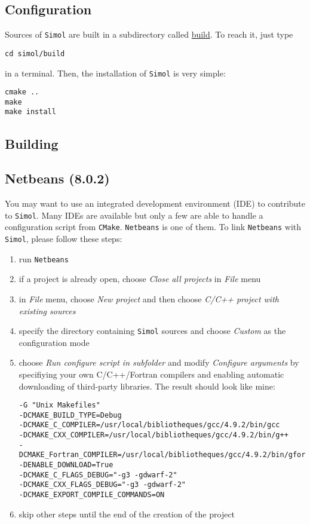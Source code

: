 \documentclass[12pt]{book}
\newcommand{\CMake}{\texttt{CMake}\xspace}
\newcommand{\Netbeans}{\texttt{Netbeans}\xspace}
\newcommand{\Simol}{\texttt{Simol}\xspace}
\begin{document}
\subsection{Configuration}

Sources of \Simol are built in a subdirectory called \url{build}. To reach it, just type
\lstset{language=bash} 
\begin{lstlisting}
cd simol/build
\end{lstlisting}
in a terminal. Then, the installation of \Simol is very simple:
\lstset{language=bash} 
\begin{lstlisting}
cmake ..
make
make install
\end{lstlisting}

\subsection{Building}



\subsection{Netbeans (8.0.2)}

You may want to use an integrated development environment (IDE) to contribute to \Simol. Many IDEs are available but only a few are able to handle a configuration script from \CMake. \Netbeans is one of them. To link \Netbeans with \Simol, please follow these steps:
\begin{enumerate}
\item run \Netbeans
\item if a project is already open, choose \textit{Close all projects} in \textit{File} menu
\item in \textit{File} menu, choose \textit{New project} and then choose \textit{C/C++ project with existing sources}
\item specify the directory containing \Simol sources and choose \textit{Custom} as the configuration mode
\item choose \textit{Run configure script in subfolder} and modify \textit{Configure arguments} by specifiying your own C/C++/Fortran compilers and enabling automatic downloading of third-party libraries. The result should look like mine:
\lstset{language=bash} 
\begin{lstlisting}
-G "Unix Makefiles" 
-DCMAKE_BUILD_TYPE=Debug 
-DCMAKE_C_COMPILER=/usr/local/bibliotheques/gcc/4.9.2/bin/gcc 
-DCMAKE_CXX_COMPILER=/usr/local/bibliotheques/gcc/4.9.2/bin/g++ 
-DCMAKE_Fortran_COMPILER=/usr/local/bibliotheques/gcc/4.9.2/bin/gfortran 
-DENABLE_DOWNLOAD=True 
-DCMAKE_C_FLAGS_DEBUG="-g3 -gdwarf-2" 
-DCMAKE_CXX_FLAGS_DEBUG="-g3 -gdwarf-2" 
-DCMAKE_EXPORT_COMPILE_COMMANDS=ON
\end{lstlisting}
\item skip other steps until the end of the creation of the project
\end{enumerate}
\end{document}
